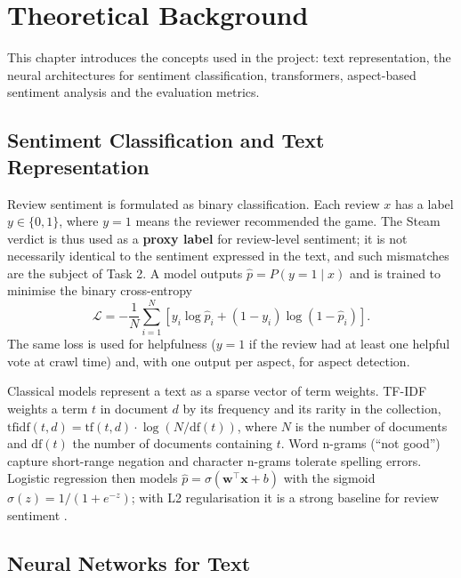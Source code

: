 \chapter{Theoretical Background}
\label{chap:background}

This chapter introduces the concepts used in the project: text representation, the neural architectures for sentiment classification, transformers, aspect-based sentiment analysis and the evaluation metrics.

\section{Sentiment Classification and Text Representation}

Review sentiment is formulated as binary classification. Each review $x$ has a label $y \in \{0, 1\}$, where $y = 1$ means the reviewer recommended the game. The Steam verdict is thus used as a \textbf{proxy label} for review-level sentiment; it is not necessarily identical to the sentiment expressed in the text, and such mismatches are the subject of Task 2. A model outputs $\hat{p} = P(y = 1 \mid x)$ and is trained to minimise the binary cross-entropy
\begin{equation}
    \mathcal{L} = -\frac{1}{N}\sum_{i=1}^{N} \left[ y_i \log \hat{p}_i + (1 - y_i)\log(1 - \hat{p}_i) \right].
\end{equation}
The same loss is used for helpfulness ($y = 1$ if the review had at least one helpful vote at crawl time) and, with one output per aspect, for aspect detection.

Classical models represent a text as a sparse vector of term weights. TF-IDF weights a term $t$ in document $d$ by its frequency and its rarity in the collection, $\text{tfidf}(t, d) = \text{tf}(t, d) \cdot \log (N / \text{df}(t))$, where $N$ is the number of documents and $\text{df}(t)$ the number of documents containing $t$. Word n-grams (``not good'') capture short-range negation and character n-grams tolerate spelling errors. Logistic regression then models $\hat{p} = \sigma(\mathbf{w}^\top \mathbf{x} + b)$ with the sigmoid $\sigma(z) = 1/(1 + e^{-z})$; with L2 regularisation it is a strong baseline for review sentiment \cite{Pang2002}.

\section{Neural Networks for Text}

